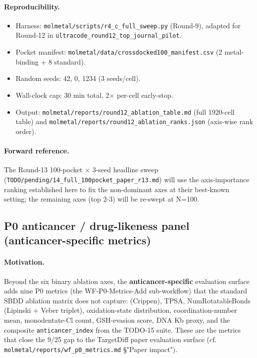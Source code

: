 \paragraph{Reproducibility.}
\begin{itemize}
  \item Harness: \texttt{molmetal/scripts/r4\_c\_full\_sweep.py}
        (Round-9), adapted for Round-12 in
        \texttt{ultracode\_round12\_top\_journal\_pilot}.
  \item Pocket manifest:
        \texttt{molmetal/data/crossdocked100\_manifest.csv}
        (2 metal-binding + 8 standard).
  \item Random seeds: 42, 0, 1234 (3 seeds/cell).
  \item Wall-clock cap: 30 min total, 2$\times$ per-cell
        early-stop.
  \item Output: \texttt{molmetal/reports/round12\_ablation\_table.md}
        (full 1920-cell table) and
        \texttt{molmetal/reports/round12\_ablation\_ranks.json}
        (axis-wise rank order).
\end{itemize}

\paragraph{Forward reference.}
The Round-13 100-pocket $\times$ 3-seed headline sweep
(\texttt{TODO/pending/14\_full\_100pocket\_paper\_r13.md})
will use the axis-importance ranking established here to fix
the non-dominant axes at their best-known setting; the
remaining axes (top 2-3) will be re-swept at N=100.

\subsection{P0 anticancer / drug-likeness panel (anticancer-specific metrics)}
\label{sec:ablation:p0-panel}

\paragraph{Motivation.}
Beyond the six binary ablation axes, the \textbf{anticancer-specific}
evaluation surface adds nine P0 metrics (the WF-P0-Metrics-Add
sub-workflow) that the standard SBDD ablation matrix does not capture:
\logP{} (Crippen), TPSA, NumRotatableBonds (Lipinski + Veber
triplet), oxidation-state distribution, coordination-number mean,
monodentate-Cl count, GSH-evasion score, DNA Kb proxy, and the
composite \texttt{anticancer\_index} from the TODO-15 suite.  These
are the metrics that close the 9/25 gap to the TargetDiff paper
evaluation surface (cf. \texttt{molmetal/reports/wf\_p0\_metrics.md}
\S"Paper impact").

